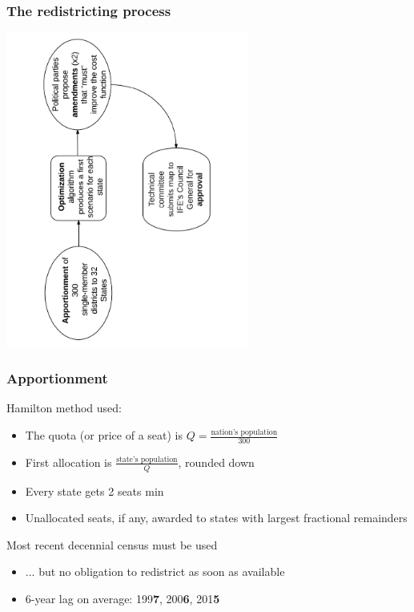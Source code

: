 \documentclass[xcolor=dvipsnames]{beamer}  %
\begin{document}
\begin{frame}                      %
    \frametitle{The redistricting process}
\begin{center}
   \includegraphics[width=8cm, angle=-90]{../../graphs/mexRedisProcessFlowchart.pdf}
\end{center}

\end{frame}
\begin{frame}                      %
    \frametitle{Apportionment}


Hamilton method used:

\begin{itemize}
\item The quota (or price of a seat) is $Q = \frac{\text{nation's population}}{300}$

\item First allocation is $\frac{\text{state's population}}{Q}$, rounded down

\item Every state gets 2 seats min

\item Unallocated seats, if any, awarded to states with largest fractional remainders
\end{itemize}

\bigskip

\pause

Most recent decennial census must be used 

\begin{itemize}
\item ... but no obligation to redistrict as soon as available
\item 6-year lag on average: 199\textbf{7}, 200\textbf{6}, 201\textbf{5}
\end{itemize}

\end{frame}
\end{document}
